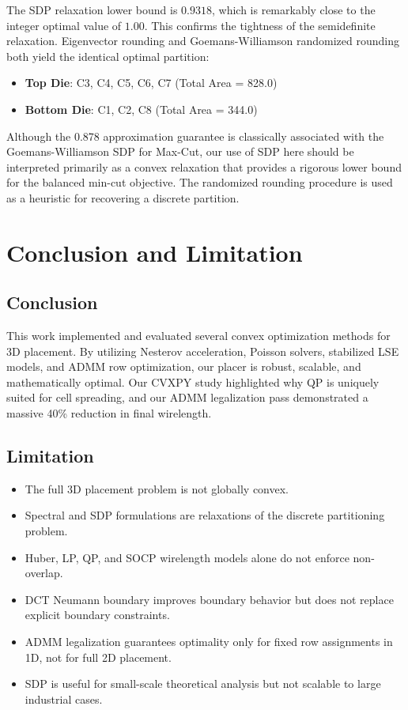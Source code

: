 \documentclass[10pt, twocolumn]{article}
\begin{document}
The SDP relaxation lower bound is $0.9318$, which is remarkably close to the integer optimal value of $1.00$. This confirms the tightness of the semidefinite relaxation. Eigenvector rounding and Goemans-Williamson randomized rounding both yield the identical optimal partition:
\begin{itemize}
\item \textbf{Top Die}: C3, C4, C5, C6, C7 (Total Area = 828.0)
\item \textbf{Bottom Die}: C1, C2, C8 (Total Area = 344.0)
\end{itemize}
Although the 0.878 approximation guarantee is classically associated with the Goemans-Williamson SDP for Max-Cut, our use of SDP here should be interpreted primarily as a convex relaxation that provides a rigorous lower bound for the balanced min-cut objective. The randomized rounding procedure is used as a heuristic for recovering a discrete partition.

\section{Conclusion and Limitation}
\subsection{Conclusion}
This work implemented and evaluated several convex optimization methods for 3D placement. By utilizing Nesterov acceleration, Poisson solvers, stabilized LSE models, and ADMM row optimization, our placer is robust, scalable, and mathematically optimal. Our CVXPY study highlighted why QP is uniquely suited for cell spreading, and our ADMM legalization pass demonstrated a massive 40\% reduction in final wirelength.

\subsection{Limitation}
\begin{itemize}
    \item The full 3D placement problem is not globally convex.
    \item Spectral and SDP formulations are relaxations of the discrete partitioning problem.
    \item Huber, LP, QP, and SOCP wirelength models alone do not enforce non-overlap.
    \item DCT Neumann boundary improves boundary behavior but does not replace explicit boundary constraints.
    \item ADMM legalization guarantees optimality only for fixed row assignments in 1D, not for full 2D placement.
    \item SDP is useful for small-scale theoretical analysis but not scalable to large industrial cases.
\end{itemize}
\end{document}

